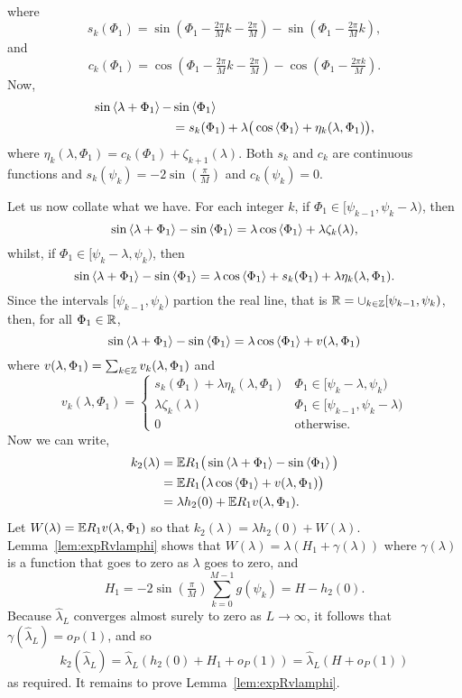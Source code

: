 \documentclass[journal]{IEEEtran}
\begin{document}
\begin{IEEEproof}
\begin{align*}
\end{align*}
where
\[
s_k(\Phi_1) = \sin(\Phi_1 - \tfrac{2\pi}{M}k - \tfrac{2\pi}{M}) - \sin(\Phi_1 - \tfrac{2\pi}{M}k),
\]
and
\[
c_k(\Phi_1) = \cos(\Phi_1 - \tfrac{2\pi}{M}k - \tfrac{2\pi}{M}) - \cos(\Phi_1 - \tfrac{2\pi k}{M}).
\]
Now,
\begin{align*}
\sin\left\langle \lambda + \Phi_1 \right\rangle - &\sin\left\langle \Phi_1 \right\rangle\\ 
&= s_k(\Phi_1) + \lambda\big(\cos\left\langle \Phi_1 \right\rangle + \eta_k(\lambda, \Phi_1) \big),
\end{align*}
where $\eta_k(\lambda, \Phi_1) = c_k(\Phi_1) + \zeta_{k+1}(\lambda)$.  Both $s_k$ and $c_k$ are continuous functions and $s_k(\psi_{k}) = -2\sin(\tfrac{\pi}{M})$ and $c_k(\psi_{k}) = 0$.

Let us now collate what we have.  For each integer $k$, if $\Phi_1 \in [\psi_{k-1}, \psi_{k} - \lambda )$, then
\[
\sin\left\langle \lambda + \Phi_1 \right\rangle - \sin\left\langle \Phi_1 \right\rangle = \lambda\cos\left\langle \Phi_1 \right\rangle + \lambda\zeta_k(\lambda),
\]
whilst, if $\Phi_1 \in [ \psi_{k} - \lambda,\psi_{k})$, then
\[
\sin\left\langle \lambda + \Phi_1 \right\rangle - \sin\left\langle \Phi_1 \right\rangle = \lambda \cos\left\langle \Phi_1 \right\rangle + s_k(\Phi_1) + \lambda\eta_k(\lambda, \Phi_1).
\]
Since the intervals $[\psi_{k-1}, \psi_{k})$ partion the real line, that is ${\mathbb R} = \cup_{k\in{\mathbb Z}}[\psi_{k-1}, \psi_{k})$, then, for all $\Phi_1 \in {\mathbb R}$,
\[
\sin\left\langle \lambda + \Phi_1 \right\rangle - \sin\left\langle \Phi_1 \right\rangle = \lambda\cos\left\langle \Phi_1 \right\rangle +  v(\lambda, \Phi_1) 
\]
where $v(\lambda, \Phi_1) = \sum_{k\in{\mathbb Z}} v_k(\lambda, \Phi_1)$ and
\begin{equation}\label{eq:vk}
v_k(\lambda,\Phi_1) = \begin{cases}
s_k(\Phi_1) + \lambda\eta_k(\lambda, \Phi_1) &  \Phi_1 \in [ \psi_{k} - \lambda,\psi_{k} ) \\
\lambda\zeta_k(\lambda) & \Phi_1 \in [\psi_{k-1}, \psi_{k} - \lambda ) \\
0 & \text{otherwise}.
\end{cases}
\end{equation}
Now we can write,
\begin{align*}
k_2(\lambda) &=  {\mathbb E} R_1\big( \sin\left\langle \lambda + \Phi_1 \right\rangle - \sin\left\langle \Phi_1 \right\rangle \big) \\
&= {\mathbb E} R_1\big( \lambda\cos\left\langle \Phi_1 \right\rangle + v(\lambda, \Phi_1)  \big) \\
&= \lambda h_2(0) + {\mathbb E} R_1 v(\lambda, \Phi_1).
\end{align*}
Let $W(\lambda) = {\mathbb E} R_1 v(\lambda, \Phi_1)$ so that $k_2(\lambda) = \lambda h_2(0) + W(\lambda).$  Lemma~\ref{lem:expRvlamphi} shows that $W(\lambda) =  \lambda(H_1 + \gamma(\lambda))$ where $\gamma(\lambda)$ is a function that goes to zero as $\lambda$ goes to zero, and
\[
H_1 = - 2 \sin(\tfrac{\pi}{M}) \sum_{k = 0}^{M-1} g(\psi_k) = H - h_2(0).
\]
Because $\hat{\lambda}_L$ converges almost surely to zero as $L \rightarrow\infty$, it follows that $\gamma(\hat{\lambda}_L) = o_P(1)$, and so
\[
k_2(\hat{\lambda}_L) = \hat{\lambda}_L ( h_2(0) + H_1 + o_P(1) ) = \hat{\lambda}_L ( H + o_P(1) )
\]
as required.  It remains to prove Lemma~\ref{lem:expRvlamphi}.
\end{IEEEproof}
\end{document}
